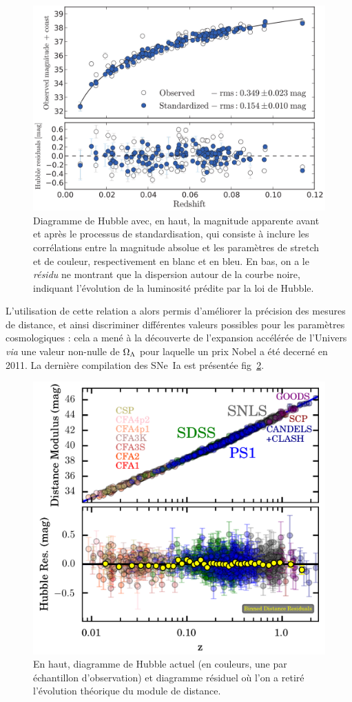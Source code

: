 \documentclass[a4paper, 12pt, svgnames]{article}
\begin{document}
\begin{figure}[htbp!]
    \centering
    \includegraphics[width=.6\linewidth]{Rapport_figures/disp_beau.png}
    \captionsetup{justification=centering}
    \caption{Diagramme de Hubble avec, en haut, la magnitude apparente avant et
        après le processus de standardisation, qui consiste à inclure les
        corrélations entre la magnitude absolue et les paramètres de stretch et
        de couleur, respectivement en blanc et en bleu. En bas, on a le
        \textit{résidu} ne montrant que la dispersion autour de la courbe noire,
        indiquant l'évolution de la luminosité prédite par la loi de Hubble.}
    \label{disp_20}
\end{figure}

L'utilisation de cette relation a alors permis d'améliorer la précision des
mesures de distance, et ainsi discriminer différentes valeurs possibles pour les
paramètres cosmologiques : cela a mené à la découverte de l'expansion accélérée
de l'Univers \textit{via} une valeur non-nulle de $\Omega_\Lambda$ pour laquelle un prix
Nobel a été decerné en 2011. La dernière compilation des SNe~Ia est
présentée fig~\ref{fig:hub_current}.

\begin{figure}[htbp!]
    \centering
    \includegraphics[width=.6\linewidth]{Rapport_figures/hub_current.png}
    \captionsetup{justification=centering}
    \caption{En haut, diagramme de Hubble actuel (en couleurs, une par
             échantillon d'observation) et diagramme résiduel où l'on a retiré
             l'évolution théorique du module de distance.
             \cite{scolnic_complete_2018}}
    \label{fig:hub_current}
\end{figure}
\end{document}
